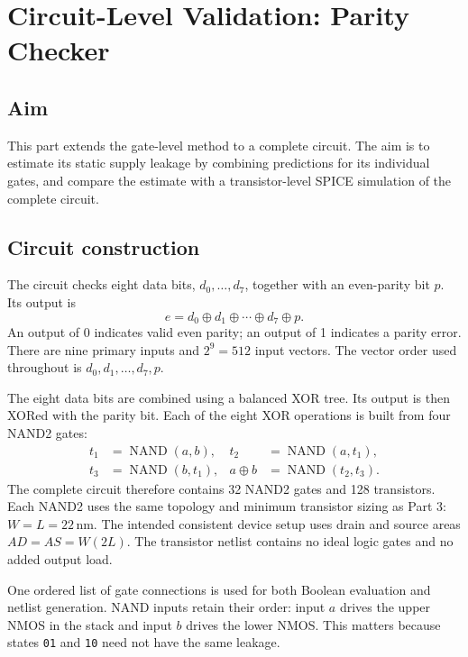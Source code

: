 \clearpage
\section{Circuit-Level Validation: Parity Checker}
\label{sec:circuit}

\subsection{Aim}
This part extends the gate-level method to a complete circuit. The aim is
to estimate its static supply leakage by combining predictions for its
individual gates, and compare the estimate with a transistor-level SPICE
simulation of the complete circuit.

\subsection{Circuit construction}
The circuit checks eight data bits, $d_0,\ldots,d_7$, together with an
even-parity bit $p$. Its output is
\begin{equation}
e=d_0\oplus d_1\oplus\cdots\oplus d_7\oplus p.
\end{equation}
An output of 0 indicates valid even parity; an output of 1 indicates a
parity error. There are nine primary inputs and $2^9=512$ input vectors.
The vector order used throughout is $d_0,d_1,\ldots,d_7,p$.

The eight data bits are combined using a balanced XOR tree. Its output is
then XORed with the parity bit. Each of the eight XOR operations is built
from four NAND2 gates:
\begin{align}
t_1&=\operatorname{NAND}(a,b), &
t_2&=\operatorname{NAND}(a,t_1),\\
t_3&=\operatorname{NAND}(b,t_1), &
a\oplus b&=\operatorname{NAND}(t_2,t_3).
\end{align}
The complete circuit therefore contains 32 NAND2 gates and 128 transistors.
Each NAND2 uses the same topology and minimum transistor sizing as Part 3:
$W=L=22$\,nm. The intended consistent device setup uses drain and source
areas $AD=AS=W(2L)$. The transistor netlist contains no ideal logic gates
and no added output load.

One ordered list of gate connections is used for both Boolean evaluation
and netlist generation. NAND inputs retain their order: input $a$ drives
the upper NMOS in the stack and input $b$ drives the lower NMOS. This matters
because states \texttt{01} and \texttt{10} need not have the same leakage.

